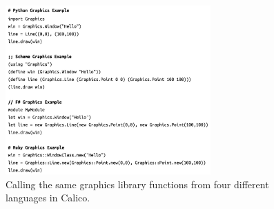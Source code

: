 \documentclass[acmsmall,screen,authorversion]{acmart}
\begin{document}
\begin{figure}
  \includegraphics[width=0.7\textwidth]{graphics-scripts.jpg}
  \caption{Calling the same graphics library functions from four different languages in Calico.}
  \label{fig:scripts}
  \Description{}
\end{figure}

\end{document}
